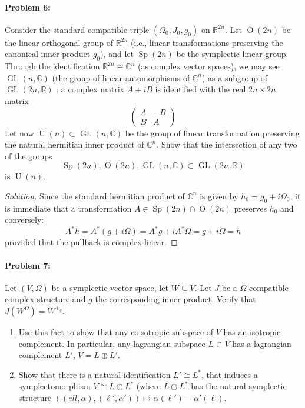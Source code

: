  \paragraph{Problem 6:} Consider the standard compatible triple $(\Omega_0,J_0,g_0)$ on $\mathbb{R}^{2n}$. Let $\operatorname{O}(2n)$ be the linear orthogonal group of $\mathbb{R}^{2n}$ (i.e., linear transformations preserving the canonical inner product $g_0$), and let $\operatorname{Sp}(2n)$ be the symplectic linear group. Through the identification $\mathbb{R}^{2n}\cong \mathbb{C}^{n}$ (as complex vector spaces), we may see $\operatorname{GL}(n,\mathbb{C})$ (the group of linear automorphisms of $\mathbb{C}^{n}$) as a subgroup of $\operatorname{GL}(2n,\mathbb{R})$ : a complex matrix $A+iB$ is identified with the real $2n\times 2n$ matrix
 \[\begin{pmatrix}A&-B\\B&A\end{pmatrix}\]
Let now $\operatorname{U}(n)\subset\operatorname{GL}(n,\mathbb{C})$ be the group of linear transformation preserving the natural hermitian inner product of $\mathbb{C}^{n}$. Show that the intersection of any two of the groups
\[\operatorname{Sp}(2n),\operatorname{O}(2n),\operatorname{GL}(n,\mathbb{C})\subset\operatorname{GL}(2n,\mathbb{R})\]
is $\operatorname{U}(n)$.

\begin{proof}[Solution]\leavevmode

	Since the standard hermitian product of $\mathbb{C}^{n}$ is given by $h_0=g_0+i\Omega_0$, it is immediate that a transformation $A\in\operatorname{Sp}(2n)\cap \operatorname{O}(2n)$ preserves $h_0$ and conversely:
	\[A^*h=A^*(g+i\Omega)=A^*g+iA^*\Omega=g+i\Omega=h\]
	provided that the pullback is complex-linear.
\end{proof}

\paragraph{Problem 7:} Let $(V,\Omega)$ be a symplectic vector space, let $W\subseteq V$. Let $J$ be a $\Omega$-compatible complex structure and $g$ the corresponding inner product. Verify that $J(W^{\Omega} )=W^{\perp_{g}}$.
\begin{enumerate}[label=\alph*.]
	\item Use this fact to show that any coisotropic subspace of $V$ has an isotropic complement. In particular, any lagrangian subspace $L\subset V$ has a lagrangian complement $L'$, $V=L\oplus L'$.
	
	\item Show that there is a natural identification $L'\cong L^{*}$, that induces a symplectomorphism $V\cong L\oplus L^{*}$ (where $L\oplus L^{*}$ has the natural symplectic structure $\left( (ell,\alpha),(\ell',\alpha') \right) \mapsto \alpha(\ell')-\alpha'(\ell)$.
\end{enumerate}

